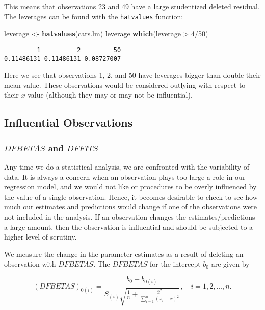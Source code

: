 \documentclass[]{book}
\newenvironment{Shaded}{\begin{snugshade}}{\end{snugshade}}
\newcommand{\KeywordTok}[1]{\textcolor[rgb]{0.13,0.29,0.53}{\textbf{{#1}}}}
\newcommand{\DecValTok}[1]{\textcolor[rgb]{0.00,0.00,0.81}{{#1}}}
\newcommand{\StringTok}[1]{\textcolor[rgb]{0.31,0.60,0.02}{{#1}}}
\newcommand{\NormalTok}[1]{{#1}}
\numberwithin{equation}{chapter}
\numberwithin{figure}{chapter}
\theoremstyle{plain}
\theoremstyle{definition}
\theoremstyle{remark}
\theoremstyle{definition}
\theoremstyle{definition}
\theoremstyle{remark}
\begin{document}
This means that observations 23 and 49 have a large studentized deleted
residual. The leverages can be found with the \texttt{hatvalues}
function:

\begin{Shaded}
\begin{Highlighting}[]
\NormalTok{leverage <-}\StringTok{ }\KeywordTok{hatvalues}\NormalTok{(cars.lm)}
\NormalTok{leverage[}\KeywordTok{which}\NormalTok{(leverage >}\StringTok{ }\DecValTok{4}\NormalTok{/}\DecValTok{50}\NormalTok{)]}
\end{Highlighting}
\end{Shaded}

\begin{verbatim}
         1          2         50 
0.11486131 0.11486131 0.08727007 
\end{verbatim}

Here we see that observations 1, 2, and 50 have leverages bigger than
double their mean value. These observations would be considered outlying
with respect to their \(x\) value (although they may or may not be
influential).

\subsection{Influential Observations}\label{influential-observations}

\subsubsection{\texorpdfstring{\(DFBETAS\) and
\(DFFITS\)}{DFBETAS and DFFITS}}\label{dfbetas-and-dffits}

Any time we do a statistical analysis, we are confronted with the
variability of data. It is always a concern when an observation plays
too large a role in our regression model, and we would not like or
procedures to be overly influenced by the value of a single observation.
Hence, it becomes desirable to check to see how much our estimates and
predictions would change if one of the observations were not included in
the analysis. If an observation changes the estimates/predictions a
large amount, then the observation is influential and should be
subjected to a higher level of scrutiny.

We measure the change in the parameter estimates as a result of deleting
an observation with \(DFBETAS\). The \(DFBETAS\) for the intercept
\(b_{0}\) are given by

\begin{equation}
(DFBETAS)_{0(i)}=\frac{b_{0}-b_{0(i)}}{S_{(i)}\sqrt{\frac{1}{n}+\frac{\overline{x}^{2}}{\sum_{i=1}^{n}(x_{i}-\overline{x})^{2}}}},\quad i=1,2,\ldots,n.
\end{equation}
\end{document}
